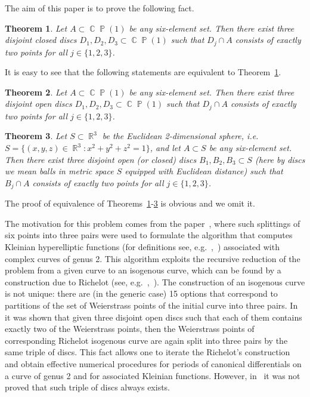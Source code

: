 \documentclass{amsart}
\numberwithin{equation}{section}
\newtheorem{theorem}{Theorem}[section]
\theoremstyle{definition}
\theoremstyle{remark}
\DeclareMathOperator{\CC}{\mathbb C}
\DeclareMathOperator{\RR}{\mathbb R}
\DeclareMathOperator{\PP}{\mathbb P}
\begin{document}
	The aim of this paper is to prove the following fact.
	
	\begin{theorem}\label{thMain}
		Let $A \subset \CC\PP(1)$ be any six-element set. Then there exist three disjoint closed discs $D_1,D_2,D_3 \subset \CC\PP(1)$ such that $D_j \cap A$ consists of exactly two points for all $j \in \{1,2,3\}$.
	\end{theorem}

	It is easy to see that the following statements are equivalent to Theorem~\ref{thMain}.
	
	\begin{theorem}\label{thMainAlt}
		Let $A \subset \CC\PP(1)$ be any six-element set. Then there exist three disjoint open discs $D_1,D_2,D_3 \subset \CC\PP(1)$ such that $D_j \cap A$ consists of exactly two points for all $j \in \{1,2,3\}$.
	\end{theorem}
	
	\begin{theorem}\label{thMainAltAlt}
		Let $S \subset \RR^3$ be the Euclidean 2-dimensional sphere, i.e. $S = \{(x,y,z) \in \RR^3: x^2 + y^2 + z^2 = 1\}$, and let $A \subset S$ be any six-element set. Then there exist three disjoint open (or closed) discs $B_1,B_2,B_3 \subset S$ (here by discs we mean balls in metric space $S$ equipped with Euclidean distance) such that $B_j \cap A$ consists of exactly two points for all $j \in \{1,2,3\}$.
	\end{theorem}

	The proof of equivalence of Theorems~\ref{thMain}-\ref{thMainAltAlt} is obvious and we omit it.
	
	The motivation for this problem comes from the paper~\cite{FinalAlgorithm}, where such splittings of six points into three pairs were used to formulate the algorithm that computes Kleinian hyperelliptic functions (for definitions see, e.g.~\cite{BuchOldAndNew},~\cite{KleinianWeight2}) associated with complex curves of genus 2. This algorithm exploits the recursive reduction of the problem from a given curve to an isogenous curve, which can be found by a construction due to Richelot (see, e.g.~\cite{Humbert},~\cite[Chap.~8]{Smith}). The construction of an isogenous curve is not unique: there are (in the generic case) 15 options that correspond to partitions of the set of Weierstrass points of the initial curve into three pairs. In~\cite{FinalAlgorithm} it was shown that given three disjoint open discs such that each of them contains exactly two of the Weierstrass points, then the Weierstrass points of corresponding Richelot isogenous curve are again split into three pairs by the same triple of discs. This fact allows one to iterate the Richelot's construction and obtain effective numerical procedures for periods of canonical differentials on a curve of genus 2 and for associated Kleinian functions. However, in~\cite{FinalAlgorithm} it was not proved that such triple of discs always exists.
	
\end{document}
